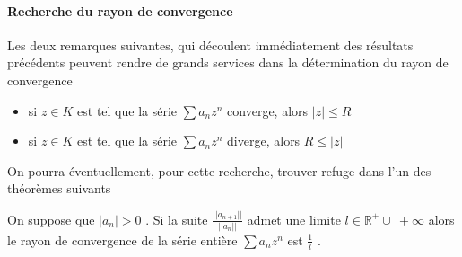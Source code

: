%
%
%
\paragraph{Recherche du rayon de convergence}
%
Les deux remarques suivantes, qui découlent immédiatement des résultats
précédents peuvent rendre de grands services dans la détermination du
rayon de convergence

\begin{itemize}
\item
   si $z \in K$ est tel que la série
  $\sum a_n z^n$ converge, alors $|z|\leq R$
\item
   si $z \in K$ est tel que la série
 $\sum a_n z^n$ diverge, alors $R \leq|z|$
\end{itemize}

On pourra éventuellement, pour cette recherche, trouver refuge dans l'un
des théorèmes suivants
%
\begin{thm}
 On suppose que $|a_n| > 0$ . Si la suite
   $\frac{||a_{n+1}||}{||a_n||}$ admet
 une limite  $l \in \mathbb{R}^{+}  \cup\ +  \infty$ alors le  rayon de
 convergence de la série entière $\sum a_n z^n$ est $\frac{1}{ l}$ .

\end{thm}

